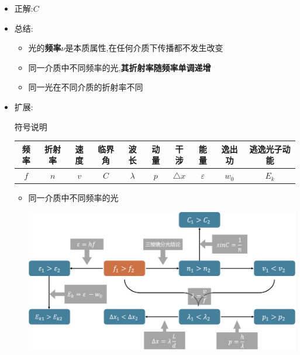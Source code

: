 \documentclass{article}
\begin{document}
\begin{itemize}
    \item 正解:\quad $C$
    \item 总结:\quad
          \begin{itemize}
              \item 光的\textbf{频率}$\nu$是本质属性,在任何介质下传播都不发生改变
              \item 同一介质中不同频率的光,\textbf{其折射率随频率单调递增}
              \item 同一光在不同介质的折射率不同
          \end{itemize}
    \item 扩展:\quad
          \begin{formal}
              符号说明

              \begin{tabular}{|c|c|c|c|c|c|c|c|c|c|}
                  \hline
                  频率  & 折射率 & 速度  & 临界角 & 波长        & 动量  & 干涉            & 能量            & 逸出功     & 逃逸光子动能  \\
                  \hline
                  $f$ & $n$ & $v$ & $C$ & $\lambda$ & $p$ & $\triangle x$ & $\varepsilon$ & $w_{0}$ & $E_{k}$ \\
                  \hline
              \end{tabular}

              \vspace*{2em}

              \begin{itemize}
                  \item 同一介质中不同频率的光

                        \vspace*{1em}
                        \includegraphics[width=40em,keepaspectratio]{./pictures/1.4-5.png}


\end{itemize}
\end{formal}
\end{itemize}
\end{document}
